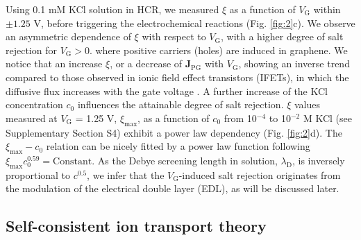 \documentclass[journal=langd5,email=true, hyperref=true, keywords=false]{achemso}
\newcommand{\Fig}{Fig.}
\begin{document}
Using 0.1 mM KCl solution in HCR, we measured $\xi$ as a function of
$V_{\mathrm{G}}$ within $\pm1.25$ V, before triggering the
electrochemical reactions (\Fig{} \ref{fig:2}c). We observe an
asymmetric dependence of $\xi$ with respect to $V_{\mathrm{G}}$, with
a higher degree of salt rejection for $V_{\mathrm{G}}>0$. where
positive carriers (holes) are induced in graphene. We notice that an
increase $\xi$, or a decrease of $\boldsymbol{J}_{\mathrm{PG}}$ with
$V_{\mathrm{G}}$, showing an inverse trend compared to those observed
in ionic field effect transistors (IFETs), in which the diffusive flux
increases with the gate voltage \cite{Nam_2009,Cheng_2018}. A further
increase of the KCl concentration $c_{0}$ influences the attainable
degree of salt rejection. $\xi$ values measured at
$V_{\mathrm{G}}$ = 1.25 V, $\xi_{\mathrm{max}}$, as a function of
$c_{0}$ from 10$^{-4}$ to 10$^{-2}$ M KCl (see Supplementary Section
S4) exhibit a power law dependency (\Fig{} \ref{fig:2}d). The
$\xi_{\mathrm{max}}-c_{0}$ relation can be nicely fitted by a power
law function following
$\xi_{\mathrm{max}} c_{0}^{0.59} = \mathrm{Constant}$. As the Debye
screening length in solution, $\lambda_{\mathrm{D}}$, is inversely
proportional to $c^{0.5}$, we infer that the $V_{\mathrm{G}}$-induced
salt rejection originates from the modulation of the electrical double
layer (EDL), as will be discussed later.

\subsection{Self-consistent ion transport theory}
\label{sec:theory}
\end{document}
